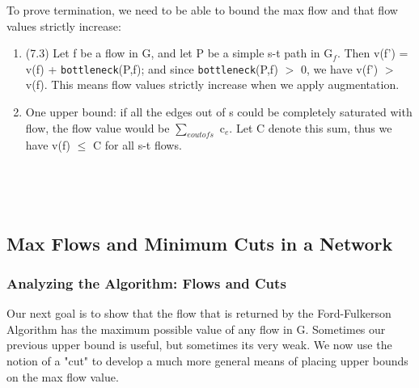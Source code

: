 \documentclass{article}
\begin{document}
\medskip

To prove termination, we need to be able to bound the max flow and that flow values strictly increase: 

\begin{enumerate}
    \item (7.3) Let f be a flow in G, and let P be a simple s-t path in G$_f$. Then v(f') = v(f) + \texttt{bottleneck}(P,f); and since \texttt{bottleneck}(P,f) $>$ 0, we have v(f') $>$ v(f). This means flow values strictly increase when we apply augmentation.
    \item One upper bound: if all the edges out of s could be completely saturated with flow, the flow value would be $\sum_{e out of s}$ c$_e$. Let C denote this sum, thus we have v(f) $\le$ C for all s-t flows. 
\end{enumerate}

\\

\medskip

\\

\subsection{Max Flows and Minimum Cuts in a Network}
\subsubsection{Analyzing the Algorithm: Flows and Cuts}
Our next goal is to show that the flow that is returned by the Ford-Fulkerson Algorithm has the maximum possible value of any flow in G. Sometimes our previous upper bound is useful, but sometimes its very weak. We now use the notion of a "cut" to develop a much more general means of placing upper bounds on the max flow value.\\
\end{document}
